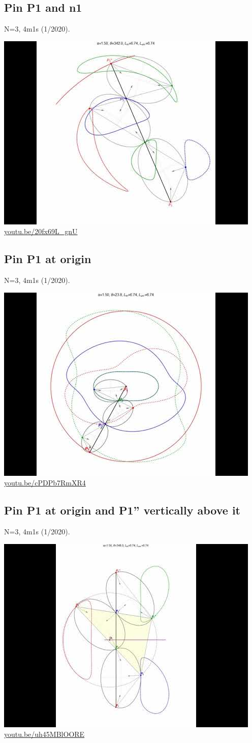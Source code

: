 \documentclass[12pt]{amsart}
\begin{document}
\subsection{Pin P1 and n1}
\label{vid:20fx69L_gnU}
\noindent N=3, 4m1s (1/2020). 
\begin{center}\includegraphics[width=.5\textwidth]{pics/20fx69L_gnU.jpg} \\ 
\href{https://youtu.be/20fx69L_gnU}{\url{youtu.be/20fx69L\_gnU}}\end{center}
% 

\subsection{Pin P1 at origin}
\label{vid:cPDPb7RmXR4}
\noindent N=3, 4m1s (1/2020). 
\begin{center}\includegraphics[width=.5\textwidth]{pics/cPDPb7RmXR4.jpg} \\ 
\href{https://youtu.be/cPDPb7RmXR4}{\url{youtu.be/cPDPb7RmXR4}}\end{center}
% 

\subsection{Pin P1 at origin and P1'' vertically above it}
\label{vid:uh45MBlOORE}
\noindent N=3, 4m1s (1/2020). 
\begin{center}\includegraphics[width=.5\textwidth]{pics/uh45MBlOORE.jpg} \\ 
\href{https://youtu.be/uh45MBlOORE}{\url{youtu.be/uh45MBlOORE}}\end{center}
% 





\end{document}
